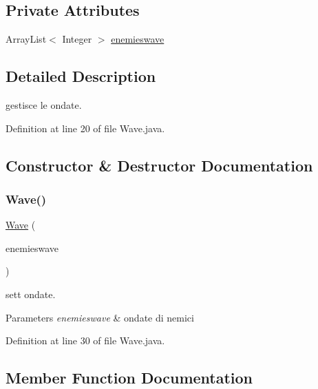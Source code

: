 \subsection*{Private Attributes}
\begin{DoxyCompactItemize}
\item 
Array\+List$<$ Integer $>$ \hyperlink{classevents_1_1_wave_af2cde6170a7bb973c8a1b5851deaa0e5}{enemieswave}
\end{DoxyCompactItemize}


\subsection{Detailed Description}
gestisce le ondate. 

Definition at line 20 of file Wave.\+java.



\subsection{Constructor \& Destructor Documentation}
\mbox{\label{classevents_1_1_wave_a43d1aadca6968f6a8b718880fd19aaa4}} 
\subsubsection{\texorpdfstring{Wave()}{Wave()}}
{\footnotesize\ttfamily \hyperlink{classevents_1_1_wave}{Wave} (\begin{DoxyParamCaption}\item[{Array\+List$<$ Integer $>$}]{enemieswave }\end{DoxyParamCaption})}



sett ondate. 


\begin{DoxyParams}{Parameters}
{\em enemieswave} & ondate di nemici \\
\hline
\end{DoxyParams}


Definition at line 30 of file Wave.\+java.



\subsection{Member Function Documentation}
\mbox{\label{classevents_1_1_wave_a196ea1965f3292364029770fc56b2dbc}} 
